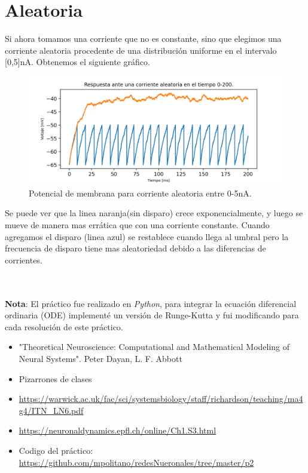 \documentclass{article}
\begin{document}
\section{Aleatoria}
Si ahora tomamos una corriente que no es constante, sino que elegimos una corriente aleatoria procedente de una distribución uniforme en el intervalo [0,5]nA. Obtenemos el siguiente gráfico.
 
\begin{figure}[H]
\centering
\includegraphics[width=\textwidth]{aleatorioConSin.png}
\caption{Potencial de membrana para corriente aleatoria entre 0-5nA. }
\label{aleatorio}
\end{figure}

Se puede ver que la linea naranja(sin disparo) crece exponencialmente, y luego se mueve de manera mas errática que con una corriente constante. Cuando agregamos el disparo (linea azul) se restablece cuando llega al umbral pero la frecuencia de disparo tiene mas aleatoriedad debido a las diferencias de corrientes.

\\
\
\
\\


\textbf{Nota}: El práctico fue realizado en \textit{Python}, para integrar la ecuación diferencial ordinaria (ODE) implementé un versión de Runge-Kutta y fui modificando para cada resolución de este práctico.

    



\begin{itemize}
\item "Theoretical Neuroscience: Computational and Mathematical Modeling of Neural Systems". Peter Dayan, L. F. Abbott

\item Pizarrones de clases

\item \url{https://warwick.ac.uk/fac/sci/systemsbiology/staff/richardson/teaching/ma4g4/ITN_LN6.pdf}
\item \url{https://neuronaldynamics.epfl.ch/online/Ch1.S3.html}
\item Codigo del práctico:  \url{https://github.com/mpolitano/redesNueronales/tree/master/p2 }

\end{itemize}
\end{document}
